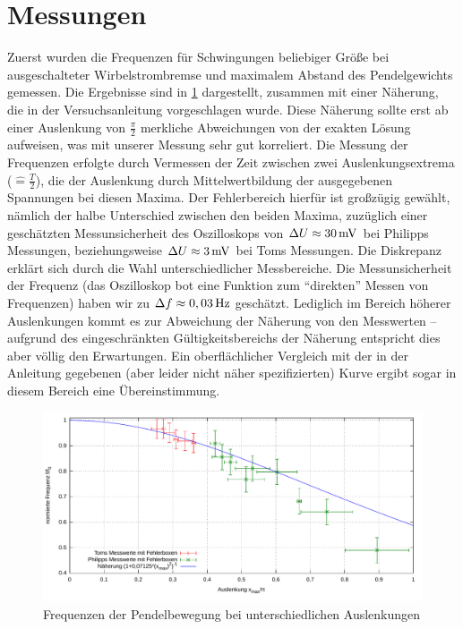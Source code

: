\documentclass[numbers=noenddot,12pt,a4paper]{scrartcl}
\begin{document}
\section{Messungen}
Zuerst wurden die Frequenzen für Schwingungen beliebiger Größe bei ausgeschalteter Wirbelstrombremse und maximalem Abstand des Pendelgewichts gemessen. Die Ergebnisse sind in \ref{img:freq} dargestellt, zusammen mit einer Näherung, die in der Versuchsanleitung vorgeschlagen wurde. Diese Näherung sollte erst ab einer Auslenkung von $\frac{\pi}{2}$ merkliche Abweichungen von der exakten Lösung aufweisen, was mit unserer Messung sehr gut korreliert. Die Messung der Frequenzen erfolgte durch Vermessen der Zeit zwischen zwei Auslenkungsextrema ($\hat{=}\frac{T}{2}$), die der Auslenkung durch Mittelwertbildung der ausgegebenen Spannungen bei diesen Maxima. Der Fehlerbereich hierfür ist großzügig gewählt, nämlich der halbe Unterschied zwischen den beiden Maxima, zuzüglich einer geschätzten Messunsicherheit des Oszilloskops von $\Delta U\approx\unit[30]{mV}$ bei Philipps Messungen, beziehungsweise $\Delta U\approx\unit[3]{mV}$ bei Toms Messungen. Die Diskrepanz erklärt sich durch die Wahl unterschiedlicher Messbereiche. Die Messunsicherheit der Frequenz (das Oszilloskop bot eine Funktion zum "`direkten"' Messen von Frequenzen) haben wir zu $\Delta f\approx\unit[0,03]{Hz}$ geschätzt. Lediglich im Bereich höherer Auslenkungen kommt es zur Abweichung der Näherung von den Messwerten -- aufgrund des eingeschränkten Gültigkeitsbereichs der Näherung entspricht dies aber völlig den Erwartungen. Ein oberflächlicher Vergleich mit der in der Anleitung gegebenen (aber leider nicht näher spezifizierten) Kurve ergibt sogar in diesem Bereich eine Übereinstimmung.
\begin{figure}[H]
	\includegraphics[width=\textwidth]{messwerte/frequenzauslenkung.pdf}
	\caption{Frequenzen der Pendelbewegung bei unterschiedlichen Auslenkungen}
	\label{img:freq}
\end{figure}
\end{document}
